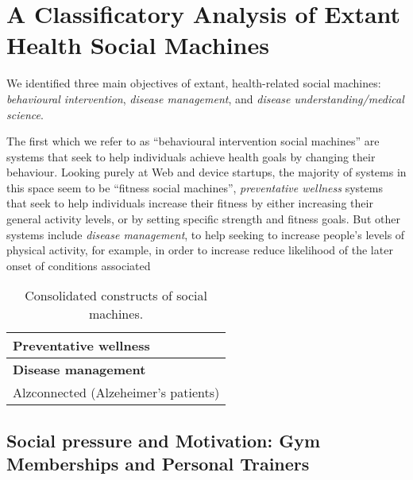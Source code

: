 \documentclass{sig-alternate}
\begin{document}




\section{A Classificatory Analysis of Extant Health Social Machines}

We identified three main objectives of extant, health-related social
machines: \emph{behavioural intervention}, \emph{disease management},
and \emph{disease understanding/medical science}.

The first which we refer to as ``behavioural intervention social
machines'' are systems that seek to help individuals achieve health
goals by changing their behaviour.  Looking purely at Web and device
startups, the majority of systems in this space seem to be ``fitness
social machines'', \emph{preventative wellness} systems that seek to
help individuals increase their fitness by either increasing their
general activity levels, or by setting specific strength and fitness
goals. But other systems include \emph{disease management}, to help
seeking to increase people's levels of physical activity, for example,
in order to increase reduce likelihood of the later onset of
conditions associated


\begin{table}[htb]
\begin{center}
\begin{tabular}{|p{8cm}|}
\hline
{\bf Preventative wellness} \\
\hline

\hline
{\bf Disease management} \\
\hline
Alzconnected (Alzeheimer's patients)

\end{tabular}
\end{center}
\caption{Consolidated constructs of social machines.} \label{table:constructs}
\end{table}





\subsection{Social pressure and Motivation: Gym Memberships and Personal Trainers}
\end{document}
